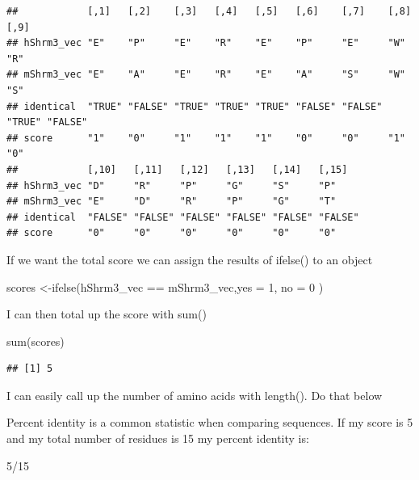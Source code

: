 \documentclass[
]{book}
\newenvironment{Shaded}{\begin{snugshade}}{\end{snugshade}}
\newcommand{\AttributeTok}[1]{\textcolor[rgb]{0.77,0.63,0.00}{#1}}
\newcommand{\DecValTok}[1]{\textcolor[rgb]{0.00,0.00,0.81}{#1}}
\newcommand{\FunctionTok}[1]{\textcolor[rgb]{0.00,0.00,0.00}{#1}}
\newcommand{\NormalTok}[1]{#1}
\newcommand{\OtherTok}[1]{\textcolor[rgb]{0.56,0.35,0.01}{#1}}
\newcommand{\SpecialCharTok}[1]{\textcolor[rgb]{0.00,0.00,0.00}{#1}}
\begin{document}
\begin{verbatim}
##            [,1]   [,2]    [,3]   [,4]   [,5]   [,6]    [,7]    [,8]   [,9]   
## hShrm3_vec "E"    "P"     "E"    "R"    "E"    "P"     "E"     "W"    "R"    
## mShrm3_vec "E"    "A"     "E"    "R"    "E"    "A"     "S"     "W"    "S"    
## identical  "TRUE" "FALSE" "TRUE" "TRUE" "TRUE" "FALSE" "FALSE" "TRUE" "FALSE"
## score      "1"    "0"     "1"    "1"    "1"    "0"     "0"     "1"    "0"    
##            [,10]   [,11]   [,12]   [,13]   [,14]   [,15]  
## hShrm3_vec "D"     "R"     "P"     "G"     "S"     "P"    
## mShrm3_vec "E"     "D"     "R"     "P"     "G"     "T"    
## identical  "FALSE" "FALSE" "FALSE" "FALSE" "FALSE" "FALSE"
## score      "0"     "0"     "0"     "0"     "0"     "0"
\end{verbatim}

If we want the total score we can assign the results of ifelse() to an object

\begin{Shaded}
\begin{Highlighting}[]
\NormalTok{scores }\OtherTok{\textless{}{-}}\FunctionTok{ifelse}\NormalTok{(hShrm3\_vec }\SpecialCharTok{==}\NormalTok{ mShrm3\_vec,}\AttributeTok{yes =} \DecValTok{1}\NormalTok{, }\AttributeTok{no =} \DecValTok{0}\NormalTok{ )}
\end{Highlighting}
\end{Shaded}

I can then total up the score with sum()

\begin{Shaded}
\begin{Highlighting}[]
\FunctionTok{sum}\NormalTok{(scores)}
\end{Highlighting}
\end{Shaded}

\begin{verbatim}
## [1] 5
\end{verbatim}

I can easily call up the number of amino acids with length(). Do that below

Percent identity is a common statistic when comparing sequences. If my score is 5 and my total number of residues is 15 my percent identity is:

\begin{Shaded}
\begin{Highlighting}[]
\DecValTok{5}\SpecialCharTok{/}\DecValTok{15}
\end{Highlighting}
\end{Shaded}
\end{document}

